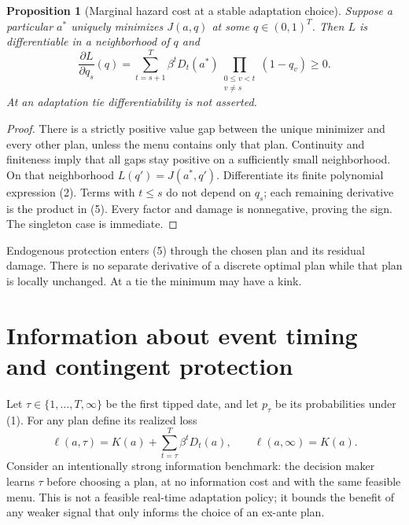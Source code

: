 \documentclass[11pt]{article}
\newtheorem{proposition}[theorem]{Proposition}
\begin{document}
\begin{proposition}[Marginal hazard cost at a stable adaptation choice]
Suppose a particular $a^*$ uniquely minimizes $J(a,q)$ at some
$q\in(0,1)^T$. Then $L$ is differentiable in a neighborhood of $q$ and
\[
 \frac{\partial L}{\partial q_s}(q)
 =\sum_{t=s+1}^{T}\beta^tD_t(a^*)
      \prod_{\substack{0\leq v<t\\v\ne s}}(1-q_v)
 \geq0.                                                       \tag{5}
\]
At an adaptation tie differentiability is not asserted.
\end{proposition}
\begin{proof}
There is a strictly positive value gap between the unique minimizer and
every other plan, unless the menu contains only that plan. Continuity and
finiteness imply that all gaps stay positive on a sufficiently small
neighborhood. On that neighborhood $L(q')=J(a^*,q')$. Differentiate its
finite polynomial expression (2). Terms with $t\leq s$ do not depend on
$q_s$; each remaining derivative is the product in (5). Every factor and
damage is nonnegative, proving the sign. The singleton case is immediate.
\end{proof}
Endogenous protection enters (5) through the chosen plan and its residual
damage. There is no separate derivative of a discrete optimal plan while
that plan is locally unchanged. At a tie the minimum may have a kink.

\section{Information about event timing and contingent protection}
Let $\tau\in\{1,\ldots,T,\infty\}$ be the first tipped date, and let
$p_\tau$ be its probabilities under (1). For any plan define its realized
loss
\[
 \ell(a,\tau)=K(a)+\sum_{t=\tau}^T\beta^tD_t(a),\qquad
 \ell(a,\infty)=K(a).                                        \tag{6}
\]
Consider an intentionally strong information benchmark: the decision maker
learns $\tau$ before choosing a plan, at no information cost and with the
same feasible menu. This is not a feasible real-time adaptation policy;
it bounds the benefit of any weaker signal that only informs the choice
of an ex-ante plan.
\end{document}
